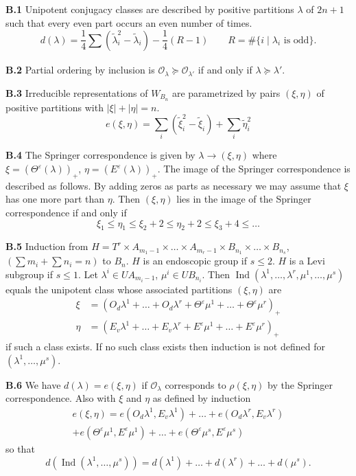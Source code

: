 \documentclass{amsart}
\newcommand\Amone[1]{A_{m_{#1}-1}}
\newcommand\eps	{\varepsilon}
\newcommand\Ilammu	{\Ind(\lam^1,\dots,\mu^s)}
\newcommand\Ind	{\operatorname{Ind}}
\newcommand\lam	{\lambda}
\newcommand\lami	{\lam_i}
\newcommand\cO		{{\mathcal O}}
\newcommand\rhoxi	{\rho(\xi,\eta)}
\newcommand\sumlam[1]{\sum_{#1} (\tilde\lam_i^2 - \tilde\lambda_i)}
\newcommand\sumxi	{\sum_i (\tilde\xi_i^2 - \tilde\xi_i)}
\begin{document}
\noindent
{\bf B.1} \qquad Unipotent conjugacy classes are described by positive partitions $\lam$ of
$2n+1$ such that every even part occurs an even number of times.
	$$
	d(\lam) = \frac 14 \sumlam{} - \frac 14 (R-1) \qquad 
	R = \#\{i \mid \lami \text{ is odd} \}.
	$$

\noindent
{\bf B.2} \qquad Partial ordering by inclusion is $\cO_\lam \succeq \cO_{\lam'}$ 
if and only if $\lam \succeq \lam'$.

\noindent
{\bf B.3} \qquad Irreducible representations of $W_{B_n}$ are parametrized 
by pairs $(\xi,\eta)$ of positive partitions with $|\xi| + |\eta| = n$.
	$$
	e(\xi,\eta) = \sumxi + \sum_i \tilde\eta_i^2
	$$

\noindent
{\bf B.4} \qquad The Springer correspondence is given by 
$\lam \to (\xi,\eta)$ where
$\xi = (\Theta^\eps(\lam))_+$, $\eta = (E^\eps(\lam))_+$.
The image of the Springer correspondence is described as follows. By adding
zeros as parts as necessary we may assume that $\xi$ has one more part than
$\eta$.  Then $(\xi,\eta)$ lies in the image of the Springer correspondence
if and only if
	$$
	\xi_1 \le \eta_1 \le \xi_2+2 \le \eta_2 + 2 \le \xi_3 + 4 \le \dots
	$$

\noindent
{\bf B.5} \qquad Induction from 
$H = T^r \times \Amone{1} \times \dots \times \Amone{r} \times B_{n_1}
	\times \dots \times B_{n_s}$, $(\sum m_i + \sum n_i = n)$ to $B_n$.
$H$ is an endoscopic group if $s \le 2$.  $H$ is a Levi subgroup if $s\le 1$.
Let $\lam^i \in UA_{m_i-1}$, $\mu^i \in UB_{n_i}$.  Then 
$\Ind(\lam^1,\dots,\lam^r,\mu^1,\dots,\mu^s)$ equals the unipotent class whose
associated partitions $(\xi,\eta)$ are
	\begin{align*}
	\xi &= (O_d\lam^1 + \dots + O_d\lam^r + \Theta^\eps \mu^1
		+ \dots + \Theta^\eps \mu^r)_+ \\
	\eta &= (E_v \lam^1 + \dots + E_v \lam^r + E^\eps \mu^1
		+ \dots + E^\eps \mu^r)_+
	\end{align*}
if such a class exists.  If no such class exists then induction is not
defined for $(\lam^1,\dots,\mu^s)$.

\noindent
{\bf B.6} \qquad We have $d(\lam) = e(\xi,\eta)$ if $\cO_\lam$ corresponds 
to $\rhoxi$ by the
Springer correspondence.  Also with $\xi$ and $\eta$ as defined by induction
	\begin{multline*}
	e(\xi,\eta) = e(O_d\lam^1, E_v \lam^1) +\dots+ e(O_d\lam^r,E_v \lam^r) \\
	+ e(\Theta^\eps \mu^1, E^\eps \mu^1) +\dots+
		e(\Theta^\eps \mu^s, E^\eps \mu^s)
	\end{multline*}
so that
	$$
	d(\Ilammu) = d(\lam^1) +\dots+ d(\lam^r) +\dots+ d(\mu^s).
	$$
\end{document}
